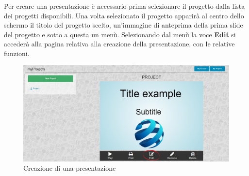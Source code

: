 Per creare una presentazione è necessario prima selezionare il progetto dalla lista dei progetti disponibili. Una volta selezionato il progetto apparirà al centro dello schermo il titolo del progetto scelto, un'immagine di anteprima della prima slide del progetto e sotto a questa un menù. Selezionando dal menù la voce \textbf{Edit} si accederà alla pagina relativa alla creazione della presentazione, con le relative funzioni.

\begin{figure}[H] 
	\centering 
	\includegraphics[scale=0.40] {img/presentazione}
	\caption{Creazione di una presentazione} 
\end{figure}